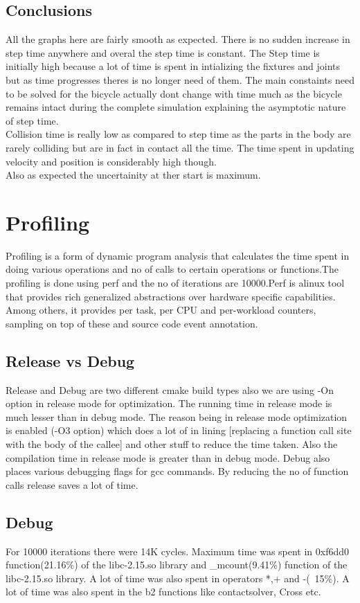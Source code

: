 \documentclass[11pt]{article}
\begin{document}
\subsection{Conclusions}
All the graphs here are fairly smooth as expected. There is no sudden increase in step time anywhere and overal the step time is constant. The Step time is initially high because a lot of time is spent in intializing the fixtures and joints but as time progresses theres is no longer need of them. The main constaints need to be solved for the bicycle actually dont change with time much as the bicycle remains intact during the complete simulation explaining the asymptotic nature of step time.\\
Collision time is really low as compared to step time as the parts in the body are rarely colliding but are in fact in contact all the time. The time spent in updating velocity and position is considerably high though.\\
Also as expected the uncertainity at ther start is maximum.
\section{Profiling}
Profiling is a form of dynamic program analysis that calculates the time spent in doing various operations and no of calls to certain operations or functions.The profiling is done using perf\cite{Perf} and the no of iterations are 10000.Perf is alinux tool that provides rich generalized abstractions over hardware specific capabilities. Among others, it provides per task, per CPU and per-workload counters, sampling on top of these and source code event annotation. 
\subsection{Release vs Debug}
Release and Debug are two different cmake build types also we are using -On option in release mode for optimization. The running time in release mode is much lesser than in debug mode. The reason being in release mode optimization is enabled (-O3 option) which does a lot of in lining [replacing a function call site with the body of the callee] and other stuff to reduce the time taken. Also the compilation time in release mode is greater than in debug mode. Debug also places various debugging flags for gcc commands. By reducing the no of function calls release saves a lot of time.
\subsection{Debug}
For 10000 iterations there were 14K cycles. Maximum time was spent in 0xf6dd0 function(21.16\%) of the libc-2.15.so library and \_mcount(9.41\%) function of the libc-2.15.so library. A lot of time was also spent in operators *,+ and -(~15\%). A lot of time was also spent in the b2 functions like contactsolver, Cross etc.
\end{document}
